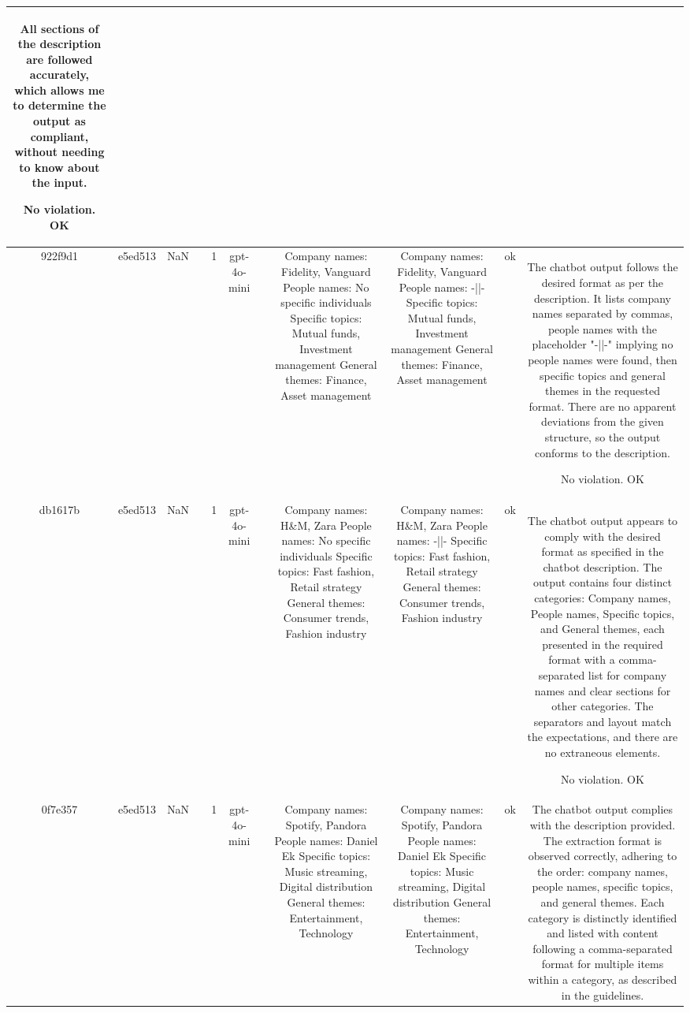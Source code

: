 \begin{table}[h!]
\begin{tabular}{|c|c|c|c|c|c|c|c|c|c|c|}
All sections of the description are followed accurately, which allows me to determine the output as compliant, without needing to know about the input.

No violation.
OK\\
\hline
922f9d1 & e5ed513 & NaN &  & 1 & gpt-4o-mini &  & Company names: Fidelity, Vanguard
People names: No specific individuals
Specific topics: Mutual funds, Investment management
General themes: Finance, Asset management & Company names: Fidelity, Vanguard  
People names: -||-  
Specific topics: Mutual funds, Investment management  
General themes: Finance, Asset management   & ok & The chatbot output follows the desired format as per the description. It lists company names separated by commas, people names with the placeholder "-||-" implying no people names were found, then specific topics and general themes in the requested format. There are no apparent deviations from the given structure, so the output conforms to the description.

No violation.
OK\\
\hline
db1617b & e5ed513 & NaN &  & 1 & gpt-4o-mini &  & Company names: H\&M, Zara
People names: No specific individuals
Specific topics: Fast fashion, Retail strategy
General themes: Consumer trends, Fashion industry & Company names: H\&M, Zara  
People names: -||-  
Specific topics: Fast fashion, Retail strategy  
General themes: Consumer trends, Fashion industry   & ok & The chatbot output appears to comply with the desired format as specified in the chatbot description. The output contains four distinct categories: Company names, People names, Specific topics, and General themes, each presented in the required format with a comma-separated list for company names and clear sections for other categories. The separators and layout match the expectations, and there are no extraneous elements.

No violation.
OK\\
\hline
0f7e357 & e5ed513 & NaN &  & 1 & gpt-4o-mini &  & Company names: Spotify, Pandora
People names: Daniel Ek
Specific topics: Music streaming, Digital distribution
General themes: Entertainment, Technology & Company names: Spotify, Pandora  
People names: Daniel Ek  
Specific topics: Music streaming, Digital distribution  
General themes: Entertainment, Technology   & ok & The chatbot output complies with the description provided. The extraction format is observed correctly, adhering to the order: company names, people names, specific topics, and general themes. Each category is distinctly identified and listed with content following a comma-separated format for multiple items within a category, as described in the guidelines.


\end{tabular}
\end{table}
